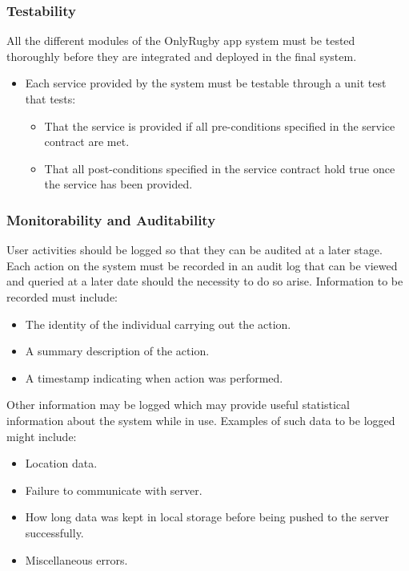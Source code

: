 \documentclass[hidelinks,a4paper,12pt]{article}
\begin{document}
	\subsubsection*{Testability}
	All the different modules of the OnlyRugby app system must be tested thoroughly before they are integrated and deployed in the final system.
	\begin{itemize}
		\item Each service provided by the system must be testable through a unit test that tests:
		\begin{itemize}
			\item That the service is provided if all pre-conditions specified in the service contract are met.
			\item That all post-conditions specified in the service contract hold true once the service has been provided.
		\end{itemize}
	\end{itemize}
	
	\subsubsection*{Monitorability and Auditability}
	User activities should be logged so that they can be audited at a later stage. Each action on the system must be recorded in an audit log that can be viewed and queried at a later date should the necessity to do so arise.
	Information to be recorded must include:
	\begin{itemize}
		\item The identity of the individual carrying out the action.
		\item A summary description of the action.
		\item A timestamp indicating when action was performed.
	\end{itemize}
	
	Other information may be logged which may provide useful statistical information about the system while in use. Examples of such data to be logged might include:
	\begin{itemize}
		\item Location data.
		\item Failure to communicate with server.
		\item How long data was kept in local storage before being pushed to the server successfully.
		\item Miscellaneous errors.
	\end{itemize}
	
\end{document}
